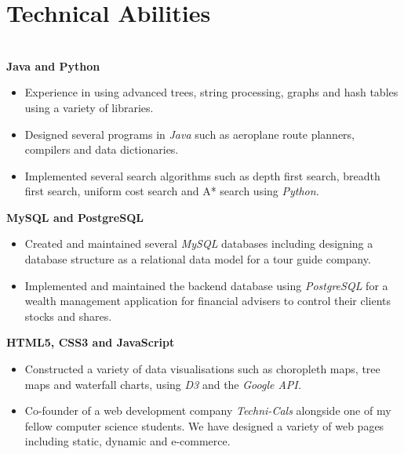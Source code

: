 \documentclass[11pt,a4paper,sans]{moderncv}
\begin{document}
\section{Technical Abilities}
\textbf{\\Java and Python}
\begin{itemize}
\item Experience in using advanced trees, string processing, graphs and hash tables using a variety of libraries.
\item Designed several programs in \textit{Java} such as aeroplane route planners, compilers and data dictionaries.
\item Implemented several search algorithms such as depth first search, breadth first search, uniform cost search and A* search using \textit{Python.}
\end{itemize}
\textbf{MySQL and PostgreSQL}
\begin{itemize}
\item Created and maintained several \textit{MySQL} databases including designing a database structure as a relational data model for a tour guide company.
\item Implemented and maintained the backend database using \textit{PostgreSQL} for a wealth management application for financial advisers to control their clients stocks and shares.
\end{itemize}
\textbf{HTML5, CSS3 and JavaScript }
\begin{itemize}
\item Constructed a variety of data visualisations such as choropleth maps, tree maps and waterfall charts, using \textit{D3} and the \textit{Google API.}
\item Co-founder of a web development company \textit{Techni-Cals} alongside one of my fellow computer science students. We have designed a variety of web pages including static, dynamic and e-commerce.
\end{itemize}
\end{document}
